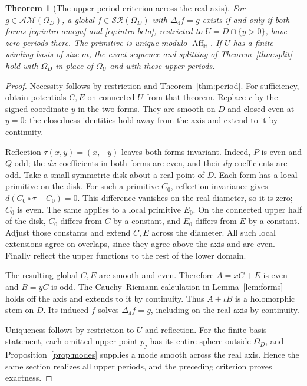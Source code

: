 \documentclass[11pt,a4paper]{article}
\numberwithin{equation}{section}
\newtheorem{theorem}{Theorem}[section]
\theoremstyle{definition}
\theoremstyle{remark}
\newcommand{\HH}{\mathbb H}
\newcommand{\SR}{\mathcal{SR}}
\newcommand{\AM}{\mathcal{AM}}
\newcommand{\Aff}{\operatorname{Aff}_{\HH}}
\newcommand{\Fu}{\Delta_4}
\begin{document}
\begin{theorem}[The upper-period criterion across the real axis]
\label{thm:realaxis}
For $g\in\AM(\Omega_D)$, a global $f\in\SR(\Omega_D)$ with $\Fu f=g$
exists if and only if both forms \eqref{eq:intro-omega} and
\eqref{eq:intro-beta}, restricted to $U=D\cap\{y>0\}$, have zero
periods there. The primitive is unique modulo $\Aff$.
If $U$ has a finite winding basis of size $m$, the exact sequence and
splitting of Theorem~\ref{thm:split} hold with $\Omega_D$ in place of
$\Omega_U$ and with these upper periods.
\end{theorem}
\begin{proof}
Necessity follows by restriction and Theorem~\ref{thm:period}.
For sufficiency, obtain potentials $C,E$ on connected $U$ from that
theorem. Replace $r$ by the signed coordinate $y$ in the two forms.
They are smooth on $D$ and closed even at $y=0$: the closedness identities
hold away from the axis and extend to it by continuity.

Reflection $\tau(x,y)=(x,-y)$ leaves both forms invariant. Indeed,
$P$ is even and $Q$ odd; the $dx$ coefficients in both forms are even,
and their $dy$ coefficients are odd. Take a small symmetric disk about
a real point of $D$. Each form has a local primitive on the disk.
For such a primitive $C_0$, reflection invariance gives
$d(C_0\circ\tau-C_0)=0$. This difference vanishes on the real diameter,
so it is zero; $C_0$ is even. The same applies to a local primitive $E_0$.
On the connected upper half of the disk, $C_0$ differs from $C$ by a
constant, and $E_0$ differs from $E$ by a constant. Adjust those constants
and extend $C,E$ across the diameter. All such local extensions agree on
overlaps, since they agree above the axis and are even. Finally reflect
the upper functions to the rest of the lower domain.

The resulting global $C,E$ are smooth and even. Therefore
$A=xC+E$ is even and $B=yC$ is odd. The Cauchy--Riemann calculation in
Lemma~\ref{lem:forms} holds off the axis and extends to it by continuity.
Thus $A+\iota B$ is a holomorphic stem on $D$. Its induced $f$ solves
$\Fu f=g$, including on the real axis by continuity.

Uniqueness follows by restriction to $U$ and reflection. For the finite
basis statement, each omitted upper point $p_j$ has its entire sphere
outside $\Omega_D$, and Proposition~\ref{prop:modes} supplies a mode
smooth across the real axis. Hence the same section realizes all upper
periods, and the preceding criterion proves exactness.
\end{proof}
\end{document}
